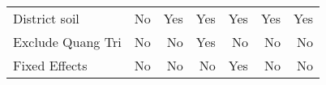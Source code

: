 \begin{table}[htbp]
\begin{tabular}{l*{6}{D{.}{.}{-1}}}
District soil       &          No         &         Yes         &         Yes         &         Yes         &         Yes         &         Yes         \\
Exclude Quang Tri   &          No         &          No         &         Yes         &          No         &          No         &          No         \\
Fixed Effects       &          No         &          No         &          No         &         Yes         &          No         &          No         \\
\bottomrule
\end{tabular}
\end{table}
